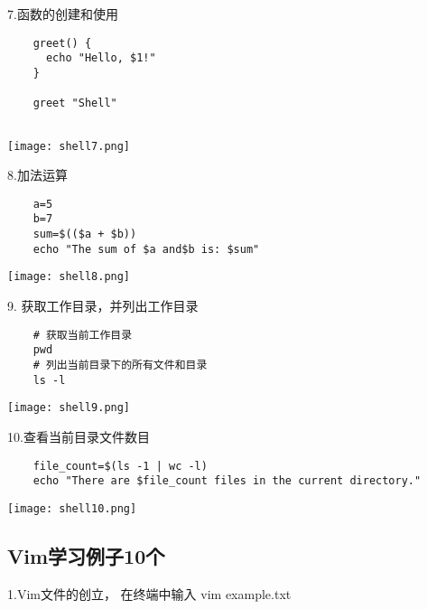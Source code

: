 \documentclass{article}
\begin{document}
7.函数的创建和使用
\begin{verbatim}
    greet() {
      echo "Hello, $1!"
    }
  
    greet "Shell"
       
\end{verbatim}

\noindent
\begin{minipage}{\linewidth}
 \centering
  \texttt{[image: shell7.png]}
  \label{fig:example}
\end{minipage}

8.加法运算
\begin{verbatim}
    a=5
    b=7
    sum=$(($a + $b))
    echo "The sum of $a and$b is: $sum"
\end{verbatim}



\noindent
\begin{minipage}{\linewidth}
 \centering
  \texttt{[image: shell8.png]}
  \label{fig:example}
\end{minipage}

9. 获取工作目录，并列出工作目录
\begin{verbatim}
    # 获取当前工作目录
    pwd
    # 列出当前目录下的所有文件和目录
    ls -l
\end{verbatim}

\begin{minipage}{\linewidth}
    \centering
     \texttt{[image: shell9.png]}
     \label{fig:example}
\end{minipage}


10.查看当前目录文件数目
\begin{verbatim}
    file_count=$(ls -1 | wc -l)
    echo "There are $file_count files in the current directory."
\end{verbatim}


\noindent
\begin{minipage}{\linewidth}
 \centering
  \texttt{[image: shell10.png]}
  \label{fig:example}
\end{minipage}



\subsection{Vim学习例子10个}
1.Vim文件的创立，
在终端中输入 vim example.txt
\end{document}
